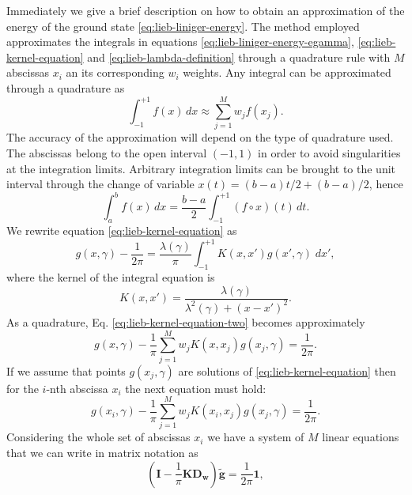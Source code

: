 Immediately we give a brief description on how to obtain an approximation of the
energy of the ground state \eqref{eq:lieb-liniger-energy}. The method employed
approximates the integrals in equations \eqref{eq:lieb-liniger-energy-egamma},
\eqref{eq:lieb-kernel-equation} and \eqref{eq:lieb-lambda-definition} through a
quadrature rule with $M$ abscissas $x_i$ an its corresponding $w_i$ weights. Any
integral can be approximated through a quadrature as
%
\begin{equation}
  \int_{-1}^{+1} f(x) \, dx \approx \sum_{j=1}^{M} w_j f(x_j).
\end{equation}
%
The accuracy of the approximation will depend on the type of quadrature used.
The abscissas belong to the open interval  $(-1, 1)$ in order to avoid
singularities at the integration limits. Arbitrary integration limits can be
brought to the unit interval through the change of variable $x(t) = (b - a)t/2
  + (b - a)/2$, hence
%
\begin{equation}
  \int_{a}^{b} f(x) \, dx = \frac{b-a}{2} \int_{-1}^{+1} (f \circ x)(t) \, dt.
\end{equation}
%
We rewrite equation \eqref{eq:lieb-kernel-equation} as
%
\begin{equation}
  \label{eq:lieb-kernel-equation-two}
  g(x, \gamma) - \frac{1}{2\pi} = \frac{\lambda(\gamma)}{\pi} \int_{-1}^{+1} K(x, x') g(x', \gamma) \; dx',
\end{equation}
%
where the kernel of the integral equation is
%
\begin{equation}
  K(x, x') = \frac{\lambda(\gamma)}{\lambda^2(\gamma) + (x - x')^2}.
\end{equation}
%
As a quadrature, Eq. \eqref{eq:lieb-kernel-equation-two} becomes approximately
%
\begin{equation}
  \label{eq:lieb-kernel-equation-quad}
  g(x, \gamma) - \frac{1}{\pi} \sum_{j=1}^{M} w_j K(x, x_j)  g(x_j, \gamma) = \frac{1}{2\pi}.
\end{equation}
%
If we assume that points $g(x_j, \gamma)$ are solutions of
\eqref{eq:lieb-kernel-equation} then for the $i$-nth abscissa $x_i$ the next
equation must hold:
%
\begin{equation}
  \label{eq:lieb-kernel-equation-quad-equation}
  g(x_i, \gamma) - \frac{1}{\pi} \sum_{j=1}^{M} w_j K(x_i, x_j)  g(x_j, \gamma) = \frac{1}{2\pi}.
\end{equation}
%
Considering the whole set of abscissas $x_i$ we have a system of $M$ linear
equations that we can write in matrix notation as
%
\begin{equation}
  \label{eq:lieb-kernel-linear-equation-system}
  \left( \mathbf{I} - \frac{1}{\pi} \mathbf{K} \mathbf{D_w} \right)\mathbf{\tilde{g}} =
  \frac{1}{2\pi} \mathbf{1},
\end{equation}
